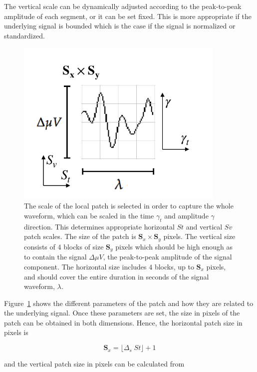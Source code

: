 \documentclass[review]{elsarticle}
\begin{document}
The vertical scale can be dynamically adjusted according to the peak-to-peak amplitude of each segment, or it can be set fixed.  This is more appropriate if the underlying signal is bounded which is the case if the signal is normalized or standardized.

\begin{figure}[h!]
\centering
\includegraphics[width=10cm]{images/patchgeometry.pdf}
\caption[Patch Geometry]{The scale of the local patch is selected in order to capture the whole waveform, which can be scaled in the time $\gamma_t$ and amplitude $\gamma$ direction.  This determines appropriate horizontal $St$ and vertical $Sv$ patch scales.  The size of the patch is $\mathbf{S}_x \times \mathbf{S}_y$ pixels. The vertical size consists of $4$ blocks of size $\mathbf{S}_y$ pixels which should be high enough as to contain the signal $\Delta \mu V$, the peak-to-peak amplitude of the signal component. The horizontal size includes $4$ blocks, up to $\mathbf{S}_x$ pixels, and should cover the entire duration in seconds of the signal waveform, $\lambda$.   }
\label{fig:patchgeometry}
\end{figure}

Figure~\ref{fig:patchgeometry} shows the different parameters of the patch and how they are related to the underlying signal. Once these parameters are set, the size in pixels of the patch can be obtained in both dimensions.  Hence, the horizontal patch size in pixels is

\begin{equation}
\mathbf{S}_x = \lfloor \Delta_s \; St \rfloor + 1
\label{eq:sx}
\end{equation}

\noindent and the vertical patch size in pixels can be calculated from
\end{document}
